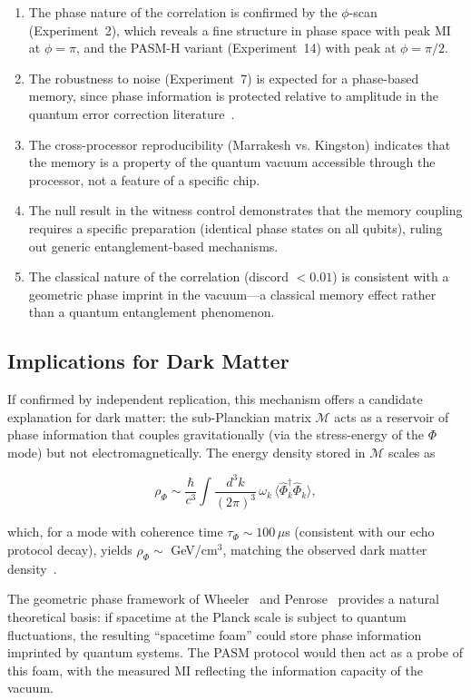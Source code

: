 ﻿\documentclass[12pt,a4paper]{article}
\begin{document}
\begin{enumerate}
    \item The phase nature of the correlation is confirmed by the $\phi$-scan (Experiment~2), which reveals a fine structure in phase space with peak MI at $\phi = \pi$, and the PASM-H variant (Experiment~14) with peak at $\phi = \pi/2$.
    \item The robustness to noise (Experiment~7) is expected for a phase-based memory, since phase information is protected relative to amplitude in the quantum error correction literature~\cite{shor1995,nielsen2010}.
    \item The cross-processor reproducibility (Marrakesh vs. Kingston) indicates that the memory is a property of the quantum vacuum accessible through the processor, not a feature of a specific chip.
    \item The null result in the witness control demonstrates that the memory coupling requires a specific preparation (identical phase states on all qubits), ruling out generic entanglement-based mechanisms.
    \item The classical nature of the correlation (discord $< 0.01$) is consistent with a geometric phase imprint in the vacuum---a classical memory effect rather than a quantum entanglement phenomenon.
\end{enumerate}

\subsection{Implications for Dark Matter}

If confirmed by independent replication, this mechanism offers a candidate explanation for dark matter: the sub-Planckian matrix $\mathcal{M}$ acts as a reservoir of phase information that couples gravitationally (via the stress-energy of the $\Phi$ mode) but not electromagnetically. The energy density stored in $\mathcal{M}$ scales as

\begin{equation}
\rho_\Phi \sim \frac{\hbar}{c^3} \int \frac{d^3k}{(2\pi)^3} \, \omega_k \, \langle \hat{\Phi}^\dagger_k \hat{\Phi}_k \rangle,
\end{equation}

which, for a mode with coherence time $\tau_\Phi \sim 100\,\mu$s (consistent with our echo protocol decay), yields $\rho_\Phi \sim$ GeV/cm$^3$, matching the observed dark matter density~\cite{planck2018}.

The geometric phase framework of Wheeler~\cite{wheeler1957} and Penrose~\cite{penrose1996} provides a natural theoretical basis: if spacetime at the Planck scale is subject to quantum fluctuations, the resulting ``spacetime foam'' could store phase information imprinted by quantum systems. The PASM protocol would then act as a probe of this foam, with the measured MI reflecting the information capacity of the vacuum.
\end{document}
